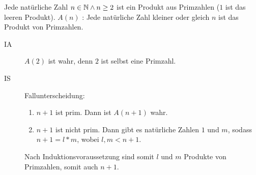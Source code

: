 \satz{}
Jede natürliche Zahl $n\in\mathbb{N} \wedge n\geq2$ ist ein Produkt aus Primzahlen ($1$ ist das leeren Produkt).
\beweis
$A(n)$ : \glqq Jede natürliche Zahl kleiner oder gleich $n$ ist das Produkt von Primzahlen.\grqq

\begin{description}
  \item[IA] $A(2)$ ist wahr, denn $2$ ist selbst eine Primzahl.
  \item[IS] Fallunterscheidung:
  \begin{enumerate}
    \item $n+1$ ist prim. Dann ist $A(n+1)$ wahr.
    \item $n+1$ ist nicht prim. Dann gibt es natürliche Zahlen $1$ und $m$, sodass $n+1=l* m$, wobei $l,m<n+1$.
  \end{enumerate}
  Nach Induktionsvoraussetzung sind somit $l$ und $m$ Produkte von Primzahlen, somit auch $n+1$.
\end{description}
